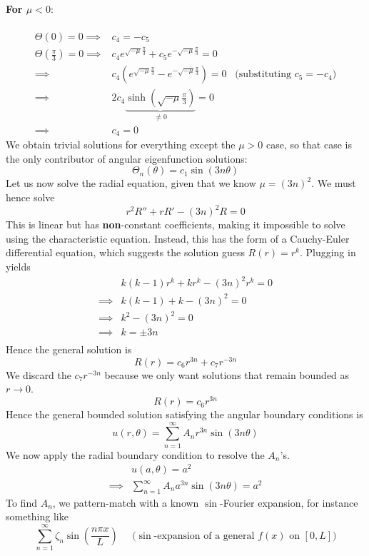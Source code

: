 \documentclass[12pt]{article}
\begin{document}
{\begin{align*}
\end{align*}
\textbf{For $\mu < 0$}: \\ \\
\begin{align*}
\Theta(0) = 0 \implies& \boxed{c_4 = -c_5}\\
\Theta \left( \frac{\pi}{3} \right) = 0 \implies& c_4 e^{\sqrt{-\mu} \frac{\pi}{3}} +c_5 e^{-\sqrt{-\mu} \frac{\pi}{3}} = 0 \\
\implies& c_4 \left( e^{\sqrt{-\mu} \frac{\pi}{3}} - e^{-\sqrt{-\mu} \frac{\pi}{3}} \right) = 0 \;\;\; \text{(substituting $c_5 = -c_4$)} \\
\implies& 2 c_4 \underbrace{ \sinh \left( \sqrt{-\mu} \frac{\pi}{3} \right) }_{\neq 0} = 0 \\
\implies& \boxed{c_4 = 0}
\end{align*}
We obtain trivial solutions for everything except the $\mu > 0$ case, so that case is the only contributor of angular eigenfunction solutions:
$$\Theta_n(\theta) = c_1 \sin \left(3n\theta \right)$$
Let us now solve the radial equation, given that we know $\mu = (3n)^2$. We must hence solve
$$r^2 R'' + r R' - (3n)^2 R = 0$$
This is linear but has \textbf{non}-constant coefficients, making it impossible to solve using the characteristic equation. Instead, this has the form of a Cauchy-Euler differential equation, which suggests the solution guess $R(r) = r^k$. Plugging in yields
\begin{align*}
& k(k-1) r^k + k r^k - (3n)^2 r^k = 0 \\
\implies& k(k-1) + k - (3n)^2 = 0 \\
\implies& k^2 - (3n)^2 = 0 \\
\implies& k = \pm 3n \\
\end{align*}
Hence the general solution is $$R(r) = c_6 r^{3n} + c_7 r^{-3n}$$
We discard the $c_7 r^{-3n}$ because we only want solutions that remain bounded as $r \to 0$.
$$R(r) = c_6 r^{3n}$$
Hence the general bounded solution satisfying the angular boundary conditions is 
$$u(r, \theta) = \sum_{n=1}^{\infty} A_n r^{3n} \sin \left( 3n\theta \right)$$
We now apply the radial boundary condition to resolve the $A_n$'s.
\begin{align*}
& u(a,\theta) = a^2 \\
\implies& \sum_{n=1}^{\infty} A_n a^{3n} \sin(3n\theta) = a^2
\end{align*}
To find $A_n$, we pattern-match with a known $\sin$-Fourier expansion, for instance something like
$$\sum_{n=1}^{\infty} \zeta_n \sin \left( \frac{n \pi x}{L} \right) \;\;\;\;\; \text{($\sin$-expansion of a general $f(x)$ on $[0, L]$)}$$
}
\end{document}
